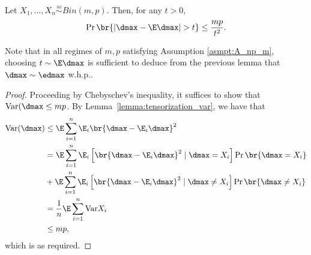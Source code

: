 \begin{lemma}\label{lemma:d_max_concentration}
    Let $X_1, \ldots, X_n  \overset{\underset{\mathrm{iid}}{}}{\sim} Bin(m,p)$. Then, for any $t > 0$, 
    \begin{align*}
        \Pr\br{\left |\dmax-\E \dmax\right|> t}\leq \frac{mp}{t^2}.
    \end{align*}
\end{lemma}
\begin{remark}
    Note that in all regimes of $m, p$ satisfying Assumption \ref{asmpt:A_np_m}, choosing $t \sim {\E \dmax}$ is sufficient to deduce from the previous lemma that $\dmax\sim \edmax$ w.h.p..
\end{remark}
\begin{proof}
    Proceeding by Chebyschev's inequality, it suffices to show that $\text{Var}(\dmax\leq mp$. By Lemma~\ref{lemma:tensorization_var}, we have that 
    \begin{align*}
        \text{Var}(\dmax) & \leq \E \sum_{i = 1}^n \E_i\br{ \dmax - \E_i \dmax}^2\\
        & = \E \sum_{i = 1}^n \E_i\left[\br{ \dmax - \E_i \dmax}^2\mid \dmax = X_i \right]\Pr \br{\dmax = X_i} \\
        & +  \E \sum_{i = 1}^n \E_i\left[\br{ \dmax - \E_i \dmax}^2\mid \dmax \neq X_i \right]\Pr \br{\dmax \neq X_i} \\
        & = \frac1n\E \sum_{i = 1}^n \text{Var}X_i \\
        & \leq mp,
    \end{align*}
which is as required.
\end{proof}
%
